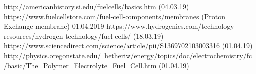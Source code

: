 http://americanhistory.si.edu/fuelcells/basics.htm (04.03.19)
https://www.fuelcellstore.com/fuel-cell-components/membranes (Proton Exchange membrane) 01.04.2019
https://www.hydrogenics.com/technology-resources/hydrogen-technology/fuel-cells/ (18.03.19) 
https://www.sciencedirect.com/science/article/pii/S1369702103003316 (01.04.19)
http://physics.oregonstate.edu/~hetheriw/energy/topics/doc/electrochemistry/fc/basic/The_Polymer_Electrolyte_Fuel_Cell.htm (01.04.19)
